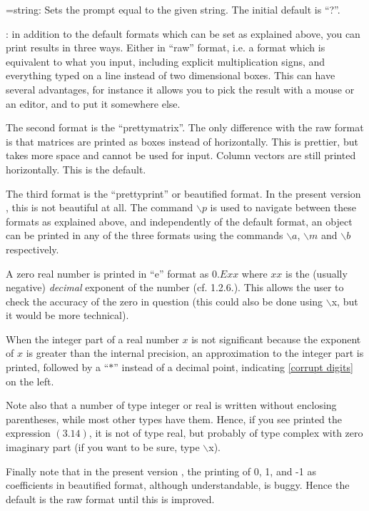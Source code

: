 \subsec{$\backslash$\ref{prompt}}=string:
Sets the prompt equal to the given string. The initial default is ``?''.

: in addition to the default
formats which can be set as explained above, you can print results in three 
ways. Either in ``raw'' format, i.e. a format which is 
equivalent to what you input, including
explicit multiplication signs, and everything typed on a line instead of
two dimensional boxes. This can have several advantages, for instance it
allows you to pick the result with a mouse or an editor, and to put it
somewhere else.

The second format is the ``prettymatrix''. The only
difference with the raw format is that matrices are printed as boxes instead of
horizontally. This is prettier, but takes more space and cannot be used for
input. Column vectors are still printed horizontally. This is the default.

The third format is the ``prettyprint'' or beautified
format. In the present version \vers, this is not beautiful at all. The command
$\backslash p$ is used to navigate between these formats as explained above,
and independently of the default format, an object can be printed in any of the
three formats using the commands $\backslash a$, $\backslash m$ and 
$\backslash b$ respectively.


A zero real number is printed in ``e'' format as $0.Exx$ where $xx$ is the
(usually negative) {\it decimal\/} exponent of the number (cf. 1.2.6.).
This allows the user to check the accuracy of the zero in question
(this could also be done using $\backslash$x, but it would be more technical).

When the integer part of a real number $x$ is not significant because the
exponent of $x$ is greater than the internal precision, an approximation to
the integer part is printed, followed by a ``$*$'' instead of a
decimal point, indicating \ref{corrupt digits} on the left.

Note also that a number of type integer or real is written without
enclosing parentheses, while most other types have them. Hence, if you see
printed the expression $( 3.14 )$, it is not of type real, but probably of
type complex with zero imaginary part (if you want to be sure, type
$\backslash$x).

Finally note that in the present version \vers, the printing of 0, 1, and
-1 as coefficients in beautified format, although understandable, is buggy.
Hence the default is the raw format until this is improved.

